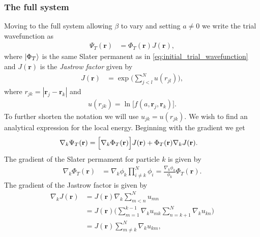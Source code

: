 \documentclass[
    a4paper, aps, twocolumn, floatfix, superscriptaddress]{revtex4-1}
\newcommand{\vf}{\mathbf}
\newcommand{\1}{\mathds{1}}
\begin{document}
        \subsubsection{The full system}
            Moving to the full system allowing $\beta$ to vary and setting $a
            \neq 0$ we write the trial wavefunction as
            \begin{align}
                \Psi_T(\vf{r})
                &=
                \Phi_T(\vf{r})
                J(\vf{r}),
            \end{align}
            where $\ket{\Phi_T}$ is the same Slater permanent as in
            \autoref{eq:initial_trial_wavefunction} and $J(\vf{r})$ is the
            \textit{Jastrow factor} given by
            \begin{align}
                J(\vf{r})
                &=
                \exp\Biggl(
                    \sum_{j < l}^N u(r_{jl})
                \Biggr),
            \end{align}
            where $r_{jk} = |\vf{r}_j - \vf{r}_k|$ and
            \begin{align}
                u(r_{jk}) = \ln\bigl[f(a, \vf{r}_j, \vf{r}_k)\bigr].
            \end{align}
            To further shorten the notation we will use $u_{jk} = u(r_{jk})$.
            We wish to find an analytical expression for the local energy.
            Beginning with the gradient we get
            \begin{align}
                \nabla_k\Psi_T(\vf{r})
                &=
                \Bigl[
                    \nabla_k
                    \Phi_T(\vf{r})
                \Bigr]
                J(\vf{r})
                + \Phi_T(\vf{r})
                \nabla_k J(\vf{r}).
            \end{align}
            The gradient of the Slater permament for particle $k$ is given by
            \begin{align}
                \nabla_k
                \Phi_T(\vf{r})
                &=
                \nabla_k\phi_k
                \prod_{i \neq k}^N\phi_i
                = \frac{\nabla_k\phi_k}{\phi_k}
                \Phi_T(\vf{r}).
            \end{align}
            The gradient of the Jastrow factor is given by
            \begin{align}
                \nabla_k J(\vf{r})
                &=
                J(\vf{r})
                \nabla_k\sum_{m < n}^N u_{mn} \\
                &= J(\vf{r})
                \Biggl(
                    \sum_{m = 1}^{k - 1}\nabla_k u_{mk}
                    \sum_{n = k + 1}^N\nabla_k u_{kn}
                \Biggr)
                \\
                &=
                J(\vf{r})
                \sum_{m \neq k}^N\nabla_k u_{km},
            \end{align}
\end{document}
